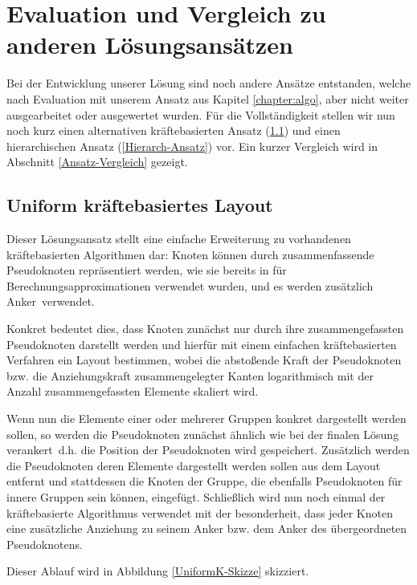 \chapter{Evaluation und Vergleich zu anderen Lösungsansätzen}
\label{chapter:vgl}

Bei der Entwicklung unserer Lösung sind noch andere Ansätze entstanden, welche nach Evaluation mit unserem Ansatz aus Kapitel \ref{chapter:algo}, aber nicht weiter ausgearbeitet oder ausgewertet wurden. Für die Vollständigkeit stellen wir nun noch kurz einen alternativen kräftebasierten Ansatz (\ref{UniformK-Ansatz}) und einen hierarchischen Ansatz (\ref{Hierarch-Ansatz}) vor. Ein kurzer Vergleich wird in Abschnitt \ref{Ansatz-Vergleich} gezeigt.

\section{Uniform kräftebasiertes Layout}
\label{UniformK-Ansatz}
Dieser Lösungsansatz stellt eine einfache Erweiterung zu vorhandenen kräftebasierten Algorithmen dar: Knoten können durch zusammenfassende Pseudoknoten repräsentiert werden, wie sie bereits in \cite{gdea_3362} für Berechnungsapproximationen verwendet wurden, und es werden zusätzlich \glqq Anker\grqq\ verwendet.

Konkret bedeutet dies, dass Knoten zunächst nur durch ihre zusammengefassten Pseudoknoten darstellt werden und hierfür mit einem einfachen kräftebasierten Verfahren ein Layout bestimmen, wobei die abstoßende Kraft der Pseudoknoten bzw. die Anziehungskraft zusammengelegter Kanten logarithmisch mit der Anzahl zusammengefassten Elemente skaliert wird.

Wenn nun die Elemente einer oder mehrerer Gruppen konkret dargestellt werden sollen, so werden die Pseudoknoten zunächst ähnlich wie bei der finalen Lösung \glqq verankert\grqq\, d.h. die Position der Pseudoknoten wird gespeichert. Zusätzlich werden die Pseudoknoten deren Elemente dargestellt werden sollen aus dem Layout entfernt und stattdessen die Knoten der Gruppe, die ebenfalls Pseudoknoten für innere Gruppen sein können, eingefügt. Schließlich wird nun noch einmal der kräftebasierte Algorithmus verwendet mit der besonderheit, dass jeder Knoten eine zusätzliche Anziehung zu seinem Anker bzw. dem Anker des übergeordneten Pseudoknotens.

Dieser Ablauf wird in Abbildung \ref{UniformK-Skizze} skizziert.

